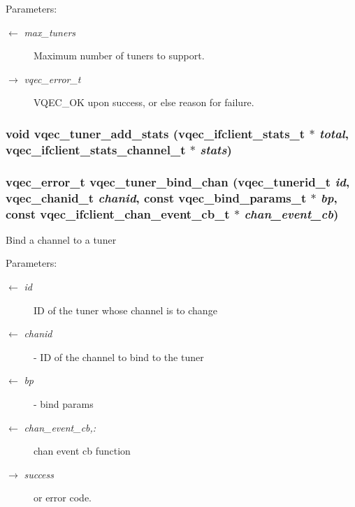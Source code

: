 \begin{Desc}
\item[Parameters:]
\begin{description}
\item[\mbox{$\leftarrow$} {\em max\_\-tuners}]Maximum number of tuners to support. \item[\mbox{$\rightarrow$} {\em vqec\_\-error\_\-t}]VQEC\_\-OK upon success, or else reason for failure. \end{description}
\end{Desc}
\subsubsection{\setlength{\rightskip}{0pt plus 5cm}void vqec\_\-tuner\_\-add\_\-stats (\bf{vqec\_\-ifclient\_\-stats\_\-t} $\ast$ {\em total}, \bf{vqec\_\-ifclient\_\-stats\_\-channel\_\-t} $\ast$ {\em stats})}\label{vqec__tuner_8h_6407d8c67de2968b7cc131cb580e5559}


\subsubsection{\setlength{\rightskip}{0pt plus 5cm}vqec\_\-error\_\-t vqec\_\-tuner\_\-bind\_\-chan (vqec\_\-tunerid\_\-t {\em id}, \bf{vqec\_\-chanid\_\-t} {\em chanid}, const \bf{vqec\_\-bind\_\-params\_\-t} $\ast$ {\em bp}, const \bf{vqec\_\-ifclient\_\-chan\_\-event\_\-cb\_\-t} $\ast$ {\em chan\_\-event\_\-cb})}\label{vqec__tuner_8h_29cf5cce3c4bd39bfeef63c48e7a2e10}


Bind a channel to a tuner \begin{Desc}
\item[Parameters:]
\begin{description}
\item[\mbox{$\leftarrow$} {\em id}]ID of the tuner whose channel is to change \item[\mbox{$\leftarrow$} {\em chanid}]- ID of the channel to bind to the tuner \item[\mbox{$\leftarrow$} {\em bp}]- bind params \item[\mbox{$\leftarrow$} {\em chan\_\-event\_\-cb,:}]chan event cb function \item[\mbox{$\rightarrow$} {\em success}]or error code. \end{description}
\end{Desc}
